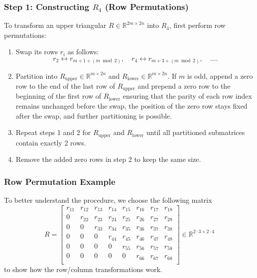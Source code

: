 \documentclass{beamer}
\begin{document}
\begin{frame}
    \frametitle{Step 1: Constructing \( R_4 \) (Row Permutations)}
    To transform an upper triangular \( R \in \mathbb{R}^{2m \times 2n} \) into \( R_4 \), first perform row permutations:
    \begin{enumerate}
\item Swap its rows $r_i$ as follows:  
   \begin{equation} \label{eq:rowswap}
       r_2 \leftrightarrow r_{m + 1 + (m \bmod 2)}, \quad r_4 \leftrightarrow r_{m + 3 + (m \bmod 2)}, \quad \dots.
   \end{equation}
\item  Partition into \( R_{\text{upper}} \in \mathbb{R}^{m \times 2n} \) and \( R_{\text{lower}} \in \mathbb{R}^{m \times 2n} \). If \( m \) is odd, append a zero row to the end of the last row of \( R_{\text{upper}} \) and prepend a zero row to the beginning of the first row of \( R_{\text{lower}} \) ensuring that the parity of each row index remains unchanged before the swap, the position of the zero row stays fixed after the swap, and further partitioning is possible.
 
\item Repeat steps 1 and 2 for \( R_{\text{upper}} \) and \( R_{\text{lower}} \) until all  partitioned submatrices contain exactly 2 rows.  
 
\item  Remove the added zero rows in step 2 to keep the same size.
\end{enumerate}
\end{frame}

\begin{frame}
    \frametitle{Row Permutation Example}
    To better understand the procedure, we choose the following matrix 
\[R= \begin{bmatrix}
 r_{11} & r_{12} & r_{13} & r_{14} & r_{15} & r_{16} & r_{17} & r_{18}\\
 0      & r_{22} & r_{23} & r_{24} & r_{25} & r_{26} & r_{27} & r_{28}\\
 0      & 0      & r_{33} & r_{34} & r_{35} & r_{36} & r_{37} & r_{38}\\
 0      & 0      & 0      & r_{44} & r_{45} & r_{46} & r_{47} & r_{48}\\
 0      & 0      & 0      & 0      & r_{55} & r_{56} & r_{57} & r_{58}\\
 0      & 0      & 0      & 0      & 0      & r_{66} & r_{67} & r_{68}\\
\end{bmatrix} \in \mathbb{R}^{2\cdot 3 \times 2 \cdot 4}
\]
    to show how the row/column transformations work. 
\end{frame}
\end{document}
